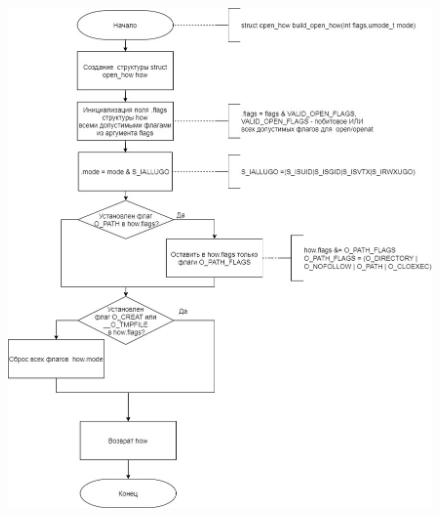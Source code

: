 \documentclass[a4paper,14pt]{extreport}
\begin{document}
\begin{figure}[H]
	\centering
	\includegraphics[scale=0.45]{img/build_open_how.jpg}
\end{figure}
\end{document}
